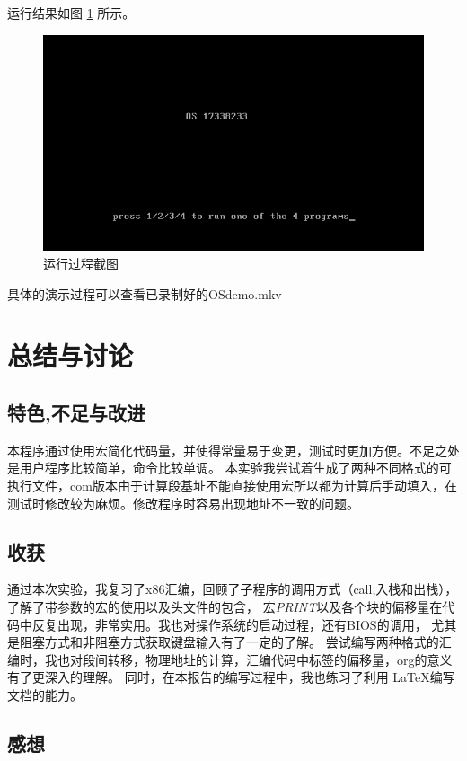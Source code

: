 \documentclass[a4paper, 11pt]{article} %
\begin{document}
运行结果如图 \ref{fig:run} 所示。

\begin{figure}[H]
  \centering
  \includegraphics[width=0.8\linewidth]{run.png}
  \caption{运行过程截图}
  \label{fig:run}
\end{figure}
具体的演示过程可以查看已录制好的OSdemo.mkv
\section{总结与讨论}



\subsection{特色,不足与改进}

本程序通过使用宏简化代码量，并使得常量易于变更，测试时更加方便。不足之处是用户程序比较简单，命令比较单调。
本实验我尝试着生成了两种不同格式的可执行文件，com版本由于计算段基址不能直接使用宏所以都为计算后手动填入，在测试时修改较为麻烦。修改程序时容易出现地址不一致的问题。
\subsection{收获}

通过本次实验，我复习了x86汇编，回顾了子程序的调用方式（call,入栈和出栈），了解了带参数的宏的使用以及头文件的包含，
宏\textit{PRINT}以及各个块的偏移量在代码中反复出现，非常实用。我也对操作系统的启动过程，还有BIOS的调用，
尤其是阻塞方式和非阻塞方式获取键盘输入有了一定的了解。
尝试编写两种格式的汇编时，我也对段间转移，物理地址的计算，汇编代码中标签的偏移量，org的意义有了更深入的理解。
同时，在本报告的编写过程中，我也练习了利用 \LaTeX 编写文档的能力。\cite{lamport94, cite}

\subsection{感想}
\end{document}
